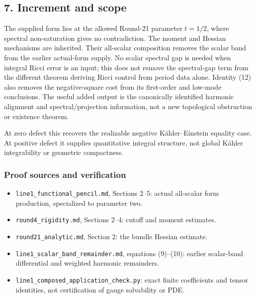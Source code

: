 \documentclass[
  11pt,
]{article}
\providecommand{\tightlist}{%
  \setlength{\itemsep}{0pt}\setlength{\parskip}{0pt}}
\begin{document}
\hypertarget{increment-and-scope}{%
\subsection{7. Increment and scope}\label{increment-and-scope}}

The supplied form lies at the allowed Round-21 parameter \(t=1/2\),
where spectral non-saturation gives no contradiction. The moment and
Hessian mechanisms are inherited. Their all-scalar composition removes
the scalar band from the earlier actual-form supply. No scalar spectral
gap is needed when integral Ricci error is an input; this does not
remove the spectral-gap term from the different theorem deriving Ricci
control from period data alone. Identity (12) also removes the
negative-square cost from its first-order and low-mode conclusions. The
useful added output is the canonically identified harmonic alignment and
spectral/projection information, not a new topological obstruction or
existence theorem.

At zero defect this recovers the realizable negative Kähler--Einstein
equality case. At positive defect it supplies quantitative integral
structure, not global Kähler integrability or geometric compactness.

\hypertarget{proof-sources-and-verification}{%
\subsubsection{Proof sources and
verification}\label{proof-sources-and-verification}}

\begin{itemize}
\tightlist
\item
  \texttt{line1\_functional\_pencil.md}, Sections 2--5: actual
  all-scalar form production, specialized to parameter two.
\item
  \texttt{round4\_rigidity.md}, Sections 2--4: cutoff and moment
  estimates.
\item
  \texttt{round21\_analytic.md}, Section 2: the bundle Hessian estimate.
\item
  \texttt{line1\_scalar\_band\_remainder.md}, equations (9)--(10):
  earlier scalar-band differential and weighted harmonic remainders.
\item
  \texttt{line1\_composed\_application\_check.py}: exact finite
  coefficients and tensor identities, not certification of gauge
  solvability or PDE.
\end{itemize}
\end{document}
